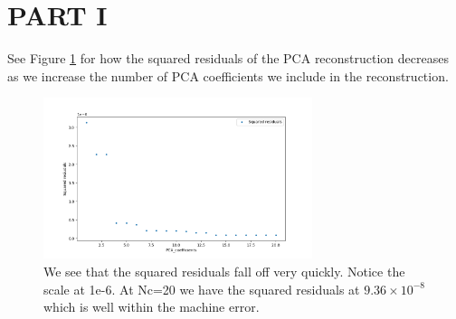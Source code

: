 \documentclass[11pt]{article}
\begin{document}
\section{PART I}
See Figure \ref{N} for how the squared residuals of the PCA reconstruction decreases as we increase the number of PCA coefficients we include in the reconstruction. 
\begin{figure}[!htbp]
    \centering
    \includegraphics[width=0.7\textwidth]{Res_N.png}
    \caption{We see that the squared residuals fall off very quickly. Notice the scale at 1e-6. At Nc=20 we have the squared residuals at $9.36 \times 10^{-8}$ which is well within the machine error.  }
    \label{N}
\end{figure}
\end{document}
